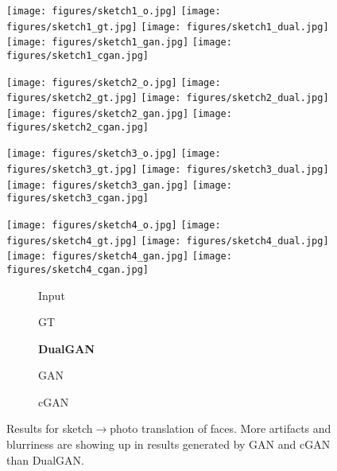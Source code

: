 \begin{figure}
\begin{center}
\texttt{[image: figures/sketch1\_o.jpg]}
\texttt{[image: figures/sketch1\_gt.jpg]}
\texttt{[image: figures/sketch1\_dual.jpg]}
\texttt{[image: figures/sketch1\_gan.jpg]}
\texttt{[image: figures/sketch1\_cgan.jpg]}

\texttt{[image: figures/sketch2\_o.jpg]}
\texttt{[image: figures/sketch2\_gt.jpg]}
\texttt{[image: figures/sketch2\_dual.jpg]}
\texttt{[image: figures/sketch2\_gan.jpg]}
\texttt{[image: figures/sketch2\_cgan.jpg]}

\texttt{[image: figures/sketch3\_o.jpg]}
\texttt{[image: figures/sketch3\_gt.jpg]}
\texttt{[image: figures/sketch3\_dual.jpg]}
\texttt{[image: figures/sketch3\_gan.jpg]}
\texttt{[image: figures/sketch3\_cgan.jpg]}

\texttt{[image: figures/sketch4\_o.jpg]}
\texttt{[image: figures/sketch4\_gt.jpg]}
\texttt{[image: figures/sketch4\_dual.jpg]}
\texttt{[image: figures/sketch4\_gan.jpg]}
\texttt{[image: figures/sketch4\_cgan.jpg]}

\begin{subfigure}[]{0.19\linewidth}\caption*{Input}\end{subfigure}
\begin{subfigure}[]{0.19\linewidth}\caption*{GT}\end{subfigure}
\begin{subfigure}[]{0.19\linewidth}\caption*{\textbf{DualGAN}}\end{subfigure}
\begin{subfigure}[]{0.19\linewidth}\caption*{GAN}\end{subfigure}
\begin{subfigure}[]{0.19\linewidth}\caption*{cGAN~\cite{isola2016image}}\end{subfigure}
\caption{Results for sketch$\rightarrow$photo translation of faces. More 
artifacts and blurriness are showing up in results generated by GAN and cGAN than 
DualGAN.} \label{fig:sketch}
\end{center}
\end{figure}






